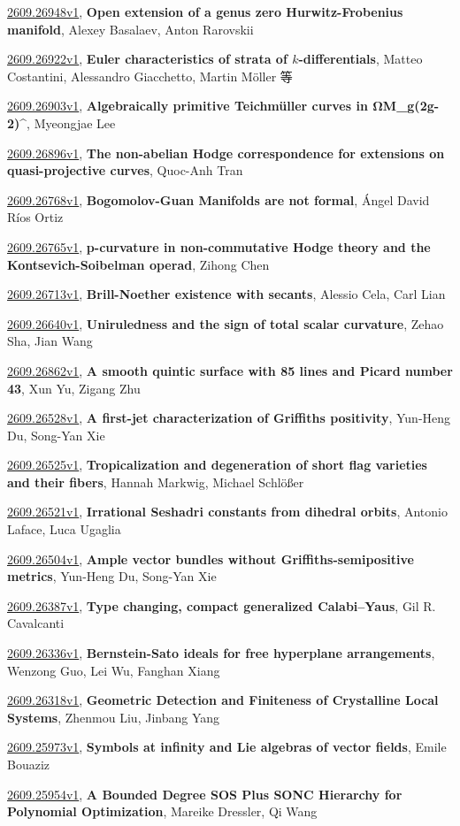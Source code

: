 \documentclass[9pt, a4paper]{article}
\theoremstyle{plain}
\theoremstyle{definition}
\theoremstyle{remark}
\newcommand{\arxiv}[3]{\href{https://arxiv.org/abs/#1}{#1}, \textbf{\textcolor{arxivblue}{#2}}, #3}
\begin{document}
\arxiv{2609.26948v1}{Open extension of a genus zero Hurwitz-Frobenius manifold}{Alexey Basalaev, Anton Rarovskii}

\arxiv{2609.26922v1}{Euler characteristics of strata of $k$-differentials}{Matteo Costantini, Alessandro Giacchetto, Martin Möller 等}

\arxiv{2609.26903v1}{Algebraically primitive Teichmüller curves in Ω\mathcal M_g(2g-2)^{\mathrm{hyp}}}{Myeongjae Lee}

\arxiv{2609.26896v1}{The non-abelian Hodge correspondence for extensions on quasi-projective curves}{Quoc-Anh Tran}

\arxiv{2609.26768v1}{Bogomolov-Guan Manifolds are not formal}{Ángel David Ríos Ortiz}

\arxiv{2609.26765v1}{p-curvature in non-commutative Hodge theory and the Kontsevich-Soibelman operad}{Zihong Chen}

\arxiv{2609.26713v1}{Brill-Noether existence with secants}{Alessio Cela, Carl Lian}

\arxiv{2609.26640v1}{Uniruledness and the sign of total scalar curvature}{Zehao Sha, Jian Wang}

\arxiv{2609.26862v1}{A smooth quintic surface with 85 lines and Picard number 43}{Xun Yu, Zigang Zhu}

\arxiv{2609.26528v1}{A first-jet characterization of Griffiths positivity}{Yun-Heng Du, Song-Yan Xie}

\arxiv{2609.26525v1}{Tropicalization and degeneration of short flag varieties and their fibers}{Hannah Markwig, Michael Schlößer}

\arxiv{2609.26521v1}{Irrational Seshadri constants from dihedral orbits}{Antonio Laface, Luca Ugaglia}

\arxiv{2609.26504v1}{Ample vector bundles without Griffiths-semipositive metrics}{Yun-Heng Du, Song-Yan Xie}

\arxiv{2609.26387v1}{Type changing, compact generalized Calabi--Yaus}{Gil R. Cavalcanti}

\arxiv{2609.26336v1}{Bernstein-Sato ideals for free hyperplane arrangements}{Wenzong Guo, Lei Wu, Fanghan Xiang}

\arxiv{2609.26318v1}{Geometric Detection and Finiteness of Crystalline Local Systems}{Zhenmou Liu, Jinbang Yang}

\arxiv{2609.25973v1}{Symbols at infinity and Lie algebras of vector fields}{Emile Bouaziz}

\arxiv{2609.25954v1}{A Bounded Degree SOS Plus SONC Hierarchy for Polynomial Optimization}{Mareike Dressler, Qi Wang}
\end{document}

